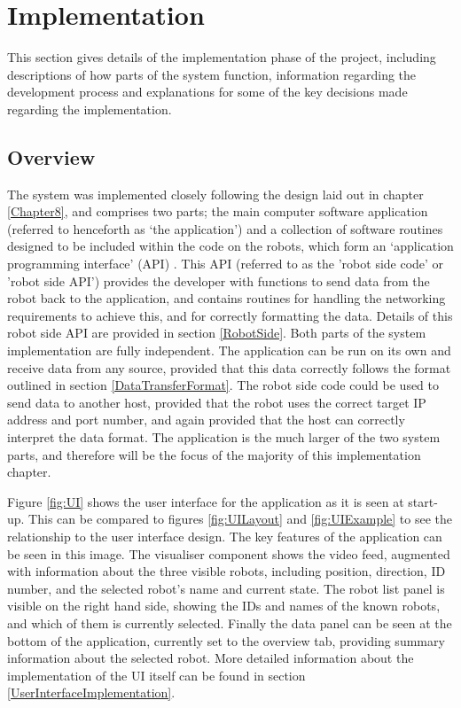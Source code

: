 
\chapter[Implementation]{Implementation} %

\label{Chapter9} %


This section gives details of the implementation phase of the project, including descriptions of how parts of the system function, information regarding the development process and explanations for some of the key decisions made regarding the implementation.

\section{Overview}
The system was implemented closely following the design laid out in chapter \ref{Chapter8}, and comprises two parts; the main computer software application (referred to henceforth as `the application') and a collection of software routines designed to be included within the code on the robots, which form an `application programming interface' (API) . This API (referred to as the 'robot side code' or 'robot side API') provides the developer with functions to send data from the robot back to the application, and contains routines for handling the networking requirements to achieve this, and for correctly formatting the data. Details of this robot side API are provided in section \ref{RobotSide}. Both parts of the system implementation are fully independent. The application can be run on its own and receive data from any source, provided that this data correctly follows the format outlined in section \ref{DataTransferFormat}. The robot side code could be used to send data to another host, provided that the robot uses the correct target IP address and port number, and again provided that the host can correctly interpret the data format. The application is the much larger of the two system parts, and therefore will be the focus of the majority of this implementation chapter.

Figure \ref{fig:UI} shows the user interface for the application as it is seen at start-up. This can be compared to figures \ref{fig:UILayout} and \ref{fig:UIExample} to see the relationship to the user interface design. The key features of the application can be seen in this image. The visualiser component shows the video feed, augmented with information about the three visible robots, including position, direction, ID number, and the selected robot's name and current state. The robot list panel is visible on the right hand side, showing the IDs and names of the known robots, and which of them is currently selected. Finally the data panel can be seen at the bottom of the application, currently set to the overview tab, providing summary information about the selected robot. More detailed information about the implementation of the UI itself can be found in section \ref{UserInterfaceImplementation}.

